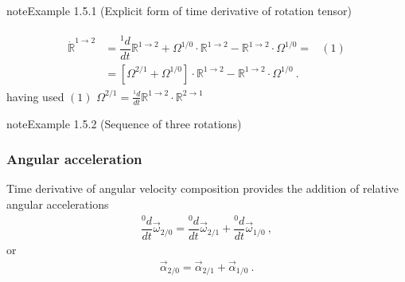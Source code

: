 \documentclass[letterpaper,10pt,english]{jupyterBook}
\begin{document}
\begin{sphinxadmonition}{note}{Example 1.5.1 (Explicit form of time derivative of rotation tensor)}


\begin{equation*}
\begin{split}\begin{aligned}
 \dot{\mathbb{R}}^{1 \rightarrow 2} 
 & = \dfrac{{}^1 d}{dt} \mathbb{R}^{1 \rightarrow 2} + \mathbb{\Omega}^{1/0} \cdot  \mathbb{R}^{1 \rightarrow 2} - \mathbb{R}^{1 \rightarrow 2} \cdot \mathbb{\Omega}^{1/0} = & (1) \\
 & = \left[ \mathbb{\Omega}^{2/1} + \mathbb{\Omega}^{1/0} \right] \cdot  \mathbb{R}^{1 \rightarrow 2} - \mathbb{R}^{1 \rightarrow 2} \cdot \mathbb{\Omega}^{1/0} \ .
\end{aligned}\end{split}
\end{equation*}
\sphinxAtStartPar
having used \((1)\) \(\mathbb{\Omega}^{2/1} = \frac{{}^1 d}{dt} \mathbb{R}^{1 \rightarrow 2} \cdot \mathbb{R}^{2 \rightarrow 1}\)
\end{sphinxadmonition}
\label{ch/kinematics-rotations-tensors:example-1}
\begin{sphinxadmonition}{note}{Example 1.5.2 (Sequence of three rotations)}



\sphinxAtStartPar
{}
\end{sphinxadmonition}
\subsubsection*{Angular acceleration}

\sphinxAtStartPar
Time derivative of angular velocity composition provides the addition of relative angular accelerations
\begin{equation*}
\begin{split}\dfrac{{}^0 d}{dt} \vec{\omega}_{2/0} = \dfrac{{}^0 d}{dt} \vec{\omega}_{2/1} + \dfrac{{}^0 d}{dt} \vec{\omega}_{1/0} \ ,\end{split}
\end{equation*}
\sphinxAtStartPar
or
\begin{equation*}
\begin{split}\vec{\alpha}_{2/0} = \vec{\alpha}_{2/1} + \vec{\alpha}_{1/0} \ .\end{split}
\end{equation*}
\end{document}
